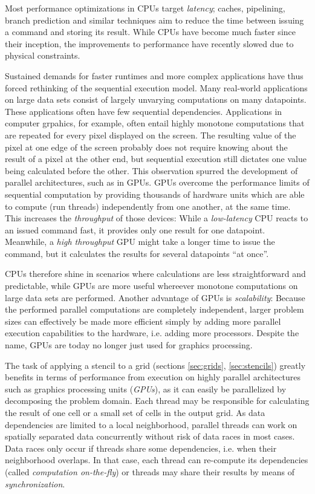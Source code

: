 Most performance optimizations in CPUs target \emph{latency}; caches, pipelining, branch prediction and similar techniques aim to reduce the time between issuing a command and storing its result. While CPUs have become much faster since their inception, the improvements to performance have recently slowed due to physical constraints.

Sustained demands for faster runtimes and more complex applications have thus forced rethinking of the sequential execution model. Many real-world applications on large data sets consist of largely unvarying computations on many datapoints. These applications often have few sequential dependencies. Applications in computer grpahics, for example, often entail highly monotone computations that are repeated for every pixel displayed on the screen. The resulting value of the pixel at one edge of the screen probably does not require knowing about the result of a pixel at the other end, but sequential execution still dictates one value being calculated before the other. This observation spurred the development of parallel architectures, such as in GPUs. GPUs overcome the performance limits of sequential computation by providing thousands of hardware units which are able to compute (run threads) independently from one another, at the same time.\cite[Chapter~2]{cuda-for-engineers} This increases the \emph{throughput} of those devices: While a \emph{low-latency} CPU reacts to an issued command fast, it provides only one result for one datapoint. Meanwhile, a \emph{high throughput} GPU might take a longer time to issue the command, but it calculates the results for several datapoints ``at once''.

CPUs therefore shine in scenarios where calculations are less straightforward and predictable, while GPUs are more useful whereever monotone computations on large data sets are performed. Another advantage of GPUs is \emph{scalability}: Because the performed parallel computations are completely independent, larger problem sizes can effectively be made more efficient simply by adding more parallel execution capabilities to the hardware, i.e. adding more processors. Despite the name, GPUs are today no longer just used for graphics processing.

The task of applying a stencil to a grid (sections \ref{sec:grids}, \ref{sec:stencils}) greatly benefits in terms of performance from execution on highly parallel architectures such as graphics processing units (\emph{GPUs}), as it can easily be parallelized by decomposing the problem domain. Each thread may be responsible for calculating the result of one cell or a small set of cells in the output grid. As data dependencies are limited to a local neighborhood, parallel threads can work on spatially separated data concurrently without risk of data races in most cases. Data races only occur if threads share some dependencies, i.e. when their neighborhood overlaps. In that case, each thread can re-compute its dependencies (called \emph{computation on-the-fly}) or threads may share their results by means of \emph{synchronization}.

